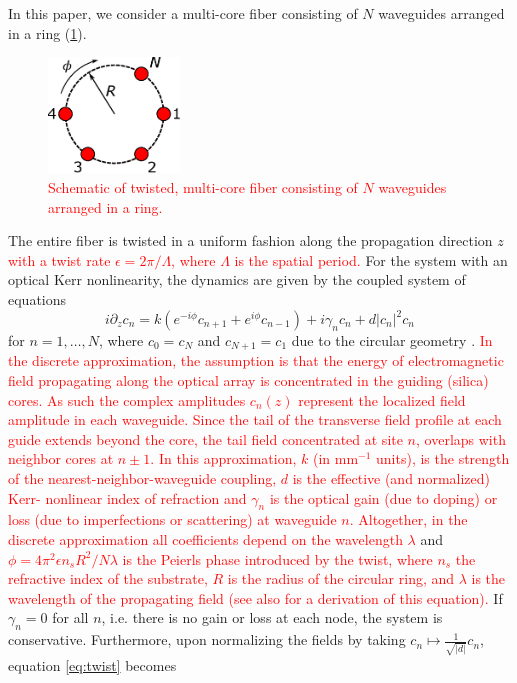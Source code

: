 \documentclass[reprint, amsmath,amssymb,aps,pra]{revtex4-2}
\def\noi{\noindent}
\renewcommand{\revised}[1]{ \textcolor{red}{#1} }
\begin{document}
In this paper, we consider a multi-core fiber consisting of $N$ waveguides arranged in a ring (\cref{fig:ring}).
\begin{figure}
\begin{center}
\includegraphics[width=3.5cm]{circle}
\end{center}
\caption{\revised{Schematic of twisted, multi-core fiber consisting of $N$ waveguides arranged in a ring.}}
\label{fig:ring}
\end{figure}
\noi The entire fiber is twisted in a uniform fashion along the propagation direction $z$ \revised{with a twist rate $\epsilon = 2\pi/\Lambda$, where $\Lambda$ is the spatial period.} For the system with an optical Kerr nonlinearity, the dynamics are given by the coupled system of equations
\begin{equation}\label{eq:twist}
i \partial_z c_n = k \left(e^{-i\phi}c_{n+1} + e^{i\phi}c_{n-1}\right) + i \gamma_n c_n + d |c_n|^2 c_n
\end{equation}
for $n = 1, \dots, N$, where $c_0 = c_{N}$ and $c_{N+1} = c_1$ due to the circular geometry \cite{castro2016,Parto2017}. \revised{In the discrete approximation, the assumption is that the energy of electromagnetic field propagating along the optical array is concentrated in the guiding (silica) cores. As such the complex amplitudes $c_n(z)$ represent the localized field amplitude in each waveguide. Since the tail of the transverse field profile at each guide extends beyond the core, the tail field concentrated at site $n$, overlaps with neighbor cores at $n\pm1$. In this approximation, $k$ (in $\text{mm}^{-1}$ units), is the strength of the nearest-neighbor-waveguide coupling, $d$ is the effective (and normalized) Kerr- nonlinear index of refraction and $\gamma_n$ is the optical gain (due to doping) or loss (due to imperfections or scattering)  at \revised{waveguide} $n$. Altogether, in the discrete approximation all coefficients depend on the wavelength $\lambda$} and \revised{
$\phi = 4 \pi^2 \epsilon n_s R^2/N \lambda$ is the Peierls phase introduced by the twist, where $n_s$ the refractive index of the substrate, $R$ is the radius of the circular ring, and $\lambda$ is the wavelength of the propagating field \cite{castro2016} (see also \cite{Longhi2007b,Garanovich2012} for a derivation of this equation).} If $\gamma_n = 0$ for all $n$, i.e. there is no gain or loss at each node, the system is conservative. Furthermore, upon normalizing the fields by taking $c_n \mapsto \frac{1}{\sqrt{|d|}}c_n$,  equation \cref{eq:twist} becomes
\end{document}
